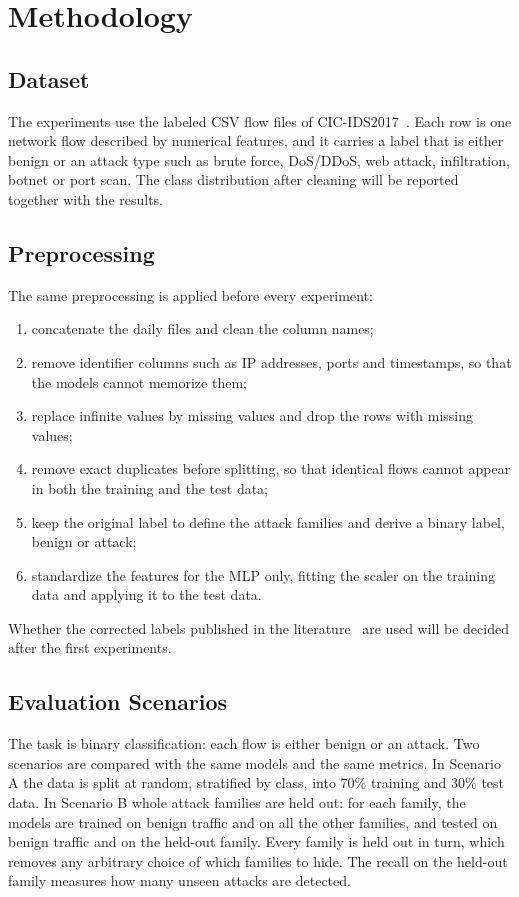 \documentclass[conference]{IEEEtran}
\newif\ifshowtodo
\newcommand{\todo}[1]{\ifshowtodo{\color{red}\textbf{[TODO: #1]}}\fi}
\begin{document}
\section{Methodology}
\subsection{Dataset}
The experiments use the labeled CSV flow files of CIC-IDS2017~\cite{sharafaldin2018}. Each row is one network flow described by numerical features, and it carries a label that is either benign or an attack type such as brute force, DoS/DDoS, web attack, infiltration, botnet or port scan. The class distribution after cleaning will be reported together with the results.

\subsection{Preprocessing}
The same preprocessing is applied before every experiment:
\begin{enumerate}
\item concatenate the daily files and clean the column names;
\item remove identifier columns such as IP addresses, ports and timestamps, so that the models cannot memorize them;
\item replace infinite values by missing values and drop the rows with missing values;
\item remove exact duplicates before splitting, so that identical flows cannot appear in both the training and the test data;
\item keep the original label to define the attack families and derive a binary label, benign or attack;
\item standardize the features for the MLP only, fitting the scaler on the training data and applying it to the test data.
\end{enumerate}
Whether the corrected labels published in the literature~\cite{engelen2021,lanvin2023} are used will be decided after the first experiments. \todo{decide after the first experiments}

\subsection{Evaluation Scenarios}
The task is binary classification: each flow is either benign or an attack. Two scenarios are compared with the same models and the same metrics. In Scenario A the data is split at random, stratified by class, into 70\% training and 30\% test data. In Scenario B whole attack families are held out: for each family, the models are trained on benign traffic and on all the other families, and tested on benign traffic and on the held-out family. Every family is held out in turn, which removes any arbitrary choice of which families to hide. \todo{define the families from the label names after inspecting the data} The recall on the held-out family measures how many unseen attacks are detected.
\end{document}
